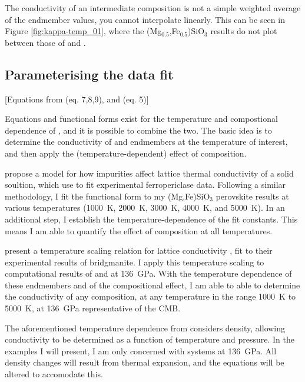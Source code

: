 The conductivity of an intermediate composition is not a simple weighted average of the endmember values, you cannot interpolate linearly. This can be seen in Figure \ref{fig:kappa-temp_01}, where the (Mg$_{0.5}$,Fe$_{0.5}$)SiO$_3$ results do not plot between those of \mgsios and \fesio.




\subsection{Parameterising the data fit} 

[Equations from \cite{Ohta2017} (eq. 7,8,9), and \cite{Okuda2017} (eq. 5)]

Equations and functional forms exist for the temperature and compostional dependence of \tc, and it is possible to combine the two. The basic idea is to determine the conductivity of \mgsios and \fesios endmembers at the temperature of interest, and then apply the (temperature-dependent) effect of composition.

\citet{Padture1997} propose a model for how impurities affect lattice thermal conductivity of a solid soultion, which \citet{Ohta2017}use to fit experimental ferropericlase data. Following a similar methodology, I fit the functional form to my (Mg,Fe)SiO$_3$ perovskite results at various temperatures (1000~K, 2000~K, 3000~K, 4000~K, and 5000~K). In an additional step, I establish the temperature-dependence of the fit constants. This means I am able to quantify the effect of composition at all temperatures.

\citet{Okuda2017} present a temperature scaling relation for lattice conductivity \citep[originally from][]{Manthilake2011}, fit to their experimental results of bridgmanite. I apply this temperature scaling to computational results of \mgsios and \fesios at 136~GPa. With the temperature dependence of these endmembers and of the compositional effect, I am able to able to determine the conductivity of any composition, at any temperature in the range 1000~K to 5000~K, at 136~GPa representative of the CMB.

The aforementioned temperature dependence from \citet{Manthilake2011} considers density, allowing conductivity to be determined as a function of temperature and pressure. In the examples I will present, I am only concerned with systems at 136~GPa. All density changes will result from thermal expansion, and the equations will be altered to accomodate this.

